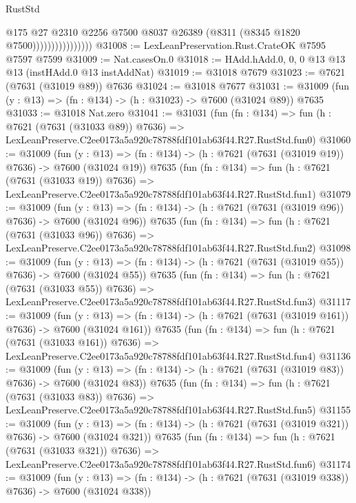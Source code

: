 \begin{lexlean}{RustStd}
\begin{coremodule}
                                @175
                                @27
                                @2310
                                @2256
                                @7500
                                @8037
                                @26389
                                (@8311 (@8345 @1820 @7500))))))))))))))))
@31008 := LexLeanPreservation.Rust.CrateOK @7595 @7597 @7599
@31009 := Nat.casesOn.{0}
@31018 := HAdd.hAdd.{0, 0, 0} @13 @13 @13 (instHAdd.{0} @13 instAddNat)
@31019 := @31018 @7679
@31023 := @7621 (@7631 (@31019 @89)) @7636
@31024 := @31018 @7677
@31031 := @31009 (fun (y : @13) => (fn : @134) -> (h : @31023) -> @7600 (@31024 @89)) @7635
@31033 := @31018 Nat.zero
@31041 := @31031
    (fun (fn : @134) =>
    fun (h : @7621 (@7631 (@31033 @89)) @7636) =>
    LexLeanPreserve.C2ee0173a5a920c78788fdf101ab63f44.R27.RustStd.fun0)
@31060 := @31009
    (fun (y : @13) => (fn : @134) -> (h : @7621 (@7631 (@31019 @19)) @7636) -> @7600 (@31024 @19))
    @7635
    (fun (fn : @134) =>
    fun (h : @7621 (@7631 (@31033 @19)) @7636) =>
    LexLeanPreserve.C2ee0173a5a920c78788fdf101ab63f44.R27.RustStd.fun1)
@31079 := @31009
    (fun (y : @13) => (fn : @134) -> (h : @7621 (@7631 (@31019 @96)) @7636) -> @7600 (@31024 @96))
    @7635
    (fun (fn : @134) =>
    fun (h : @7621 (@7631 (@31033 @96)) @7636) =>
    LexLeanPreserve.C2ee0173a5a920c78788fdf101ab63f44.R27.RustStd.fun2)
@31098 := @31009
    (fun (y : @13) => (fn : @134) -> (h : @7621 (@7631 (@31019 @55)) @7636) -> @7600 (@31024 @55))
    @7635
    (fun (fn : @134) =>
    fun (h : @7621 (@7631 (@31033 @55)) @7636) =>
    LexLeanPreserve.C2ee0173a5a920c78788fdf101ab63f44.R27.RustStd.fun3)
@31117 := @31009
    (fun (y : @13) => (fn : @134) -> (h : @7621 (@7631 (@31019 @161)) @7636) -> @7600 (@31024 @161))
    @7635
    (fun (fn : @134) =>
    fun (h : @7621 (@7631 (@31033 @161)) @7636) =>
    LexLeanPreserve.C2ee0173a5a920c78788fdf101ab63f44.R27.RustStd.fun4)
@31136 := @31009
    (fun (y : @13) => (fn : @134) -> (h : @7621 (@7631 (@31019 @83)) @7636) -> @7600 (@31024 @83))
    @7635
    (fun (fn : @134) =>
    fun (h : @7621 (@7631 (@31033 @83)) @7636) =>
    LexLeanPreserve.C2ee0173a5a920c78788fdf101ab63f44.R27.RustStd.fun5)
@31155 := @31009
    (fun (y : @13) => (fn : @134) -> (h : @7621 (@7631 (@31019 @321)) @7636) -> @7600 (@31024 @321))
    @7635
    (fun (fn : @134) =>
    fun (h : @7621 (@7631 (@31033 @321)) @7636) =>
    LexLeanPreserve.C2ee0173a5a920c78788fdf101ab63f44.R27.RustStd.fun6)
@31174 := @31009
    (fun (y : @13) => (fn : @134) -> (h : @7621 (@7631 (@31019 @338)) @7636) -> @7600 (@31024 @338))

\end{coremodule}
\end{lexlean}
